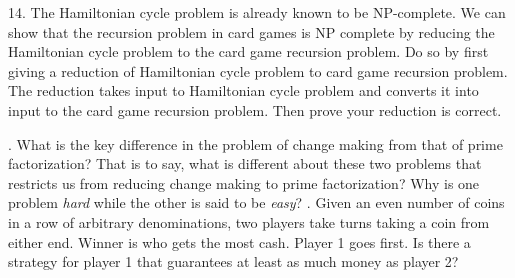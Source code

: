 \documentclass[12pt]{article}
\begin{document}
14. The Hamiltonian cycle problem is already known to be NP-complete. We can show that the recursion problem in card games is NP complete by reducing the Hamiltonian cycle problem to the card game recursion problem. Do so by first giving a reduction of Hamiltonian cycle problem to card game recursion problem. The reduction takes input to Hamiltonian cycle problem and converts it into input to the card game recursion problem. Then prove your reduction is correct.

\newpage
{}. What is the key difference in the problem of change making from that of prime factorization? That is to say,
what is different about these two problems that restricts us from reducing change making to prime factorization? Why is one problem 
\textit{hard} while the other is said to be \textit{easy}? 
\newpage
{}. Given an even number of coins in a row of arbitrary denominations, two players take turns taking a coin from either end. 
Winner is who gets the most cash. Player 1 goes first. 
Is there a strategy for player 1 that guarantees at least as much money as player 2?
\end{document}
